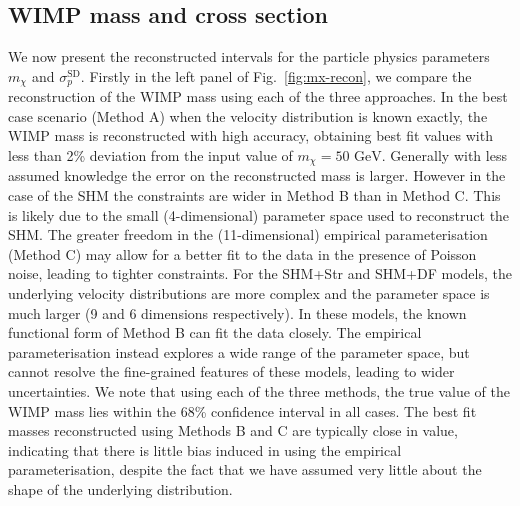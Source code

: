 \subsection{WIMP mass and cross section}\label{sec:directional_mass}
We now present the reconstructed intervals for the particle physics parameters $m_\chi$ and $\sigma_p^\mathrm{SD}$. Firstly in the left panel of Fig.~\ref{fig:mx-recon}, we compare the reconstruction of the WIMP mass using each of the three approaches. In the best case scenario (Method A) when the velocity distribution is known exactly, the WIMP mass is reconstructed with high accuracy, obtaining best fit values with less than 2\% deviation from the input value of $m_\chi = 50 \,\,\mathrm{GeV}$. Generally with less assumed knowledge the error on the reconstructed mass is larger. However in the case of the SHM the constraints are wider in Method B than in Method C. This is likely due to the small (4-dimensional) parameter space used to reconstruct the SHM. The greater freedom in the (11-dimensional) empirical parameterisation (Method C) may allow for a better fit to the data in the presence of Poisson noise, leading to tighter constraints. For the SHM+Str and SHM+DF models, the underlying velocity distributions are more complex and the parameter space is much larger (9 and 6 dimensions respectively). In these models, the known functional form of Method B can fit the data closely. The empirical parameterisation instead explores a wide range of the parameter space, but cannot resolve the fine-grained features of these models, leading to wider uncertainties. We note that using each of the three methods, the true value of the WIMP mass lies within the 68\% confidence interval in all cases. The best fit masses reconstructed using Methods B and C are typically close in value, indicating that there is little bias induced in using the empirical parameterisation, despite the fact that we have assumed very little about the shape of the underlying distribution.

